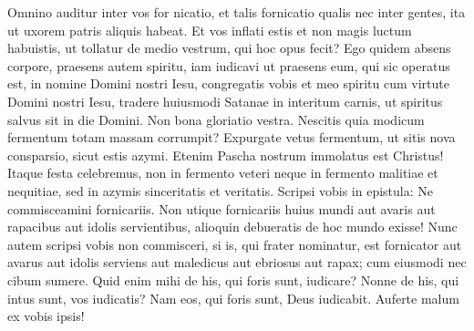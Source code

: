 \begin{biblechapter}
\begin{biblechapter}
\begin{biblechapter}
\begin{biblechapter}
\begin{biblechapter}
\verse Omnino auditur inter vos for nicatio, et talis fornicatio qualis nec inter gentes, ita ut uxorem patris aliquis habeat. 
\verse Et vos inflati estis et non magis luctum habuistis, ut tollatur de medio vestrum, qui hoc opus fecit? 
\verse Ego quidem absens corpore, praesens autem spiritu, iam iudicavi ut praesens eum, qui sic operatus est, 
\verse in nomine Domini nostri Iesu, congregatis vobis et meo spiritu cum virtute Domini nostri Iesu, 
\verse tradere huiusmodi Satanae in interitum carnis, ut spiritus salvus sit in die Domini.
 \verse Non bona gloriatio vestra. Nescitis quia modicum fermentum totam massam corrumpit? 
\verse Expurgate vetus fermentum, ut sitis nova consparsio, sicut estis azymi. Etenim Pascha nostrum immolatus est Christus! 
\verse Itaque festa celebremus, non in fermento veteri neque in fermento malitiae et nequitiae, sed in azymis sinceritatis et veritatis.
 \verse Scripsi vobis in epistula: Ne commisceamini fornicariis. 
\verse Non utique fornicariis huius mundi aut avaris aut rapacibus aut idolis servientibus, alioquin debueratis de hoc mundo exisse! 
\verse Nunc autem scripsi vobis non commisceri, si is, qui frater nominatur, est fornicator aut avarus aut idolis serviens aut maledicus aut ebriosus aut rapax; cum eiusmodi nec cibum sumere. 
 \verse Quid enim mihi de his, qui foris sunt, iudicare? Nonne de his, qui intus sunt, vos iudicatis? 
\verse Nam eos, qui foris sunt, Deus iudicabit. Auferte malum ex vobis ipsis!
 

\end{biblechapter}
\end{biblechapter}
\end{biblechapter}
\end{biblechapter}
\end{biblechapter}

